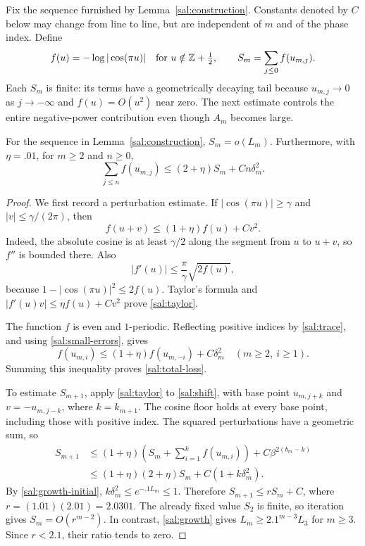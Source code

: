 Fix the sequence furnished by Lemma~\ref{sal:construction}.  Constants
denoted by $C$ below may change from line to line, but are independent of
$m$ and of the phase index.  Define
\[
 f(u)=-\log|\cos(\pi u)|
       \quad\text{for }u\notin\mathbb Z+\tfrac12,
 \qquad S_m=\sum_{j\le0}f(u_{m,j}).
\]
Each $S_m$ is finite: its terms have a geometrically decaying tail because
$u_{m,j}\to0$ as $j\to-\infty$ and $f(u)=O(u^2)$ near zero.
The next estimate controls the entire negative-power contribution even
though $A_m$ becomes large.

\begin{lemma}\label{sal:loss}
For the sequence in Lemma~\ref{sal:construction}, $S_m=o(L_m)$.
Furthermore, with $\eta=.01$, for $m\ge2$ and $n\ge0$,
\begin{equation}\label{sal:total-loss}
 \sum_{j\le n}f(u_{m,j})
       \le(2+\eta)S_m+Cn\delta_m^2.
\end{equation}
\end{lemma}

\begin{proof}
We first record a perturbation estimate.  If
$|\cos(\pi u)|\ge\gamma$ and $|v|\le\gamma/(2\pi)$, then
\begin{equation}\label{sal:taylor}
 f(u+v)\le(1+\eta)f(u)+Cv^2.
\end{equation}
Indeed, the absolute cosine is at least $\gamma/2$ along the segment
from $u$ to $u+v$, so $f''$ is bounded there.  Also
\[
 |f'(u)|\le\frac{\pi}{\gamma}\sqrt{2f(u)},
\]
because $1-|\cos(\pi u)|^2\le2f(u)$.  Taylor's formula and
$|f'(u)v|\le\eta f(u)+Cv^2$ prove \eqref{sal:taylor}.

The function $f$ is even and $1$-periodic.  Reflecting positive indices
by \eqref{sal:trace}, and using \eqref{sal:small-errors}, gives
\begin{equation}\label{sal:reflection-loss}
 f(u_{m,i})\le(1+\eta)f(u_{m,-i})+C\delta_m^2
                     \quad(m\ge2,\ i\ge1).
\end{equation}
Summing this inequality proves \eqref{sal:total-loss}.

To estimate $S_{m+1}$, apply \eqref{sal:taylor} to
\eqref{sal:shift}, with base point $u_{m,j+k}$ and
$v=-u_{m,j-k}$, where $k=k_{m+1}$.  The cosine floor holds at every
base point, including those with positive index.  The squared
perturbations have a geometric sum, so
\begin{align*}
 S_{m+1}
 &\le(1+\eta)\left(S_m+\sum_{i=1}^k f(u_{m,i})\right)
       +C\beta^{2(b_m-k)}\\
 &\le(1+\eta)(2+\eta)S_m+C(1+k\delta_m^2).
\end{align*}
By \eqref{sal:growth-initial},
$k\delta_m^2\le e^{-.1L_m}\le1$.
Therefore $S_{m+1}\le rS_m+C$, where
$r=(1.01)(2.01)=2.0301$.  The already fixed value $S_2$ is finite,
so iteration gives $S_m=O(r^{m-2})$.  In contrast,
\eqref{sal:growth} gives $L_m\ge2.1^{m-3}L_3$ for $m\ge3$.
Since $r<2.1$, their ratio tends to zero.
\end{proof}

